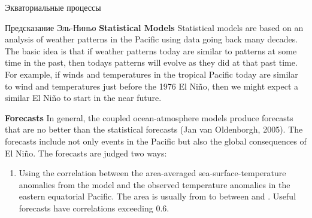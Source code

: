 \begin{chapter}{Экваториальные процессы}
\begin{section}{Предсказание Эль-Ниньо}
\textbf{Statistical Models} Statistical models are based on an
analysis of weather patterns in the Pacific using data going back many
decades. The basic idea is that if weather patterns today are similar
to patterns at some time in the past, then todays patterns will evolve
as they did at that past time. For example, if winds and temperatures
in the tropical Pacific today are similar to wind and temperatures
just before the 1976 El Ni\~{n}o, then we might expect a similar El
Ni\~{n}o to start in the near future.
%

\textbf{Forecasts} In general, the coupled ocean-atmosphere models
produce forecasts that are no better than the statistical
forecasts (Jan van Oldenborgh, 2005). The forecasts include not only
events in the Pacific but also the global consequences of El
Ni\~{n}o. The forecasts are judged two ways:
%
\begin{enumerate}
\item
Using the correlation between the area-averaged
sea-surface-temperature anomalies from the model and the observed temperature anomalies in
the eastern equatorial Pacific. The area is usually from
 to  between  and
. Useful forecasts have correlations exceeding 0.6.
%


\end{enumerate}
\end{section}
\end{chapter}
